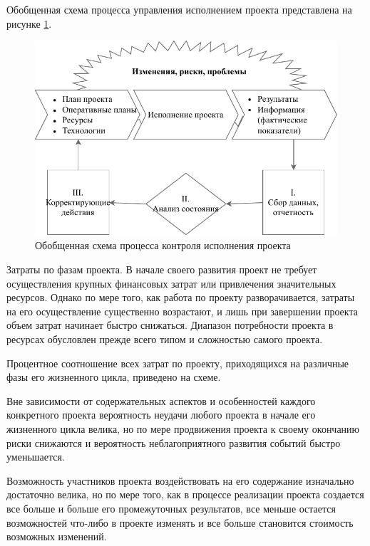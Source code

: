 Обобщенная схема процесса управления исполнением проекта представлена на рисунке \ref{fig:ris7}.
\begin{figure}[!h]
	\centering
	\includegraphics[width=\linewidth]{control}
	\caption{Обобщенная схема процесса контроля исполнения проекта}
	\label{fig:ris7}
\end{figure}

Затраты по фазам проекта.
В начале своего развития проект не требует осуществления крупных финансовых затрат или привлечения значительных ресурсов. Однако по мере того, как работа по проекту разворачивается, затраты на его осуществление существенно возрастают, и лишь при завершении проекта объем затрат начинает быстро снижаться. Диапазон потребности проекта в ресурсах обусловлен прежде всего типом и сложностью самого проекта.

Процентное соотношение всех затрат по проекту, приходящихся на различные фазы его жизненного цикла, приведено на схеме.

Вне зависимости от содержательных аспектов и особенностей каждого конкретного проекта вероятность неудачи любого проекта в начале его жизненного цикла велика, но по мере продвижения проекта к своему окончанию риски снижаются и вероятность неблагоприятного развития событий быстро уменьшается.

Возможность участников проекта воздействовать на его содержание изначально достаточно велика, но по мере того, как в процессе реализации проекта создается все больше и больше его промежуточных результатов, все меньше остается возможностей что-либо в проекте изменять и все больше становится стоимость возможных изменений.